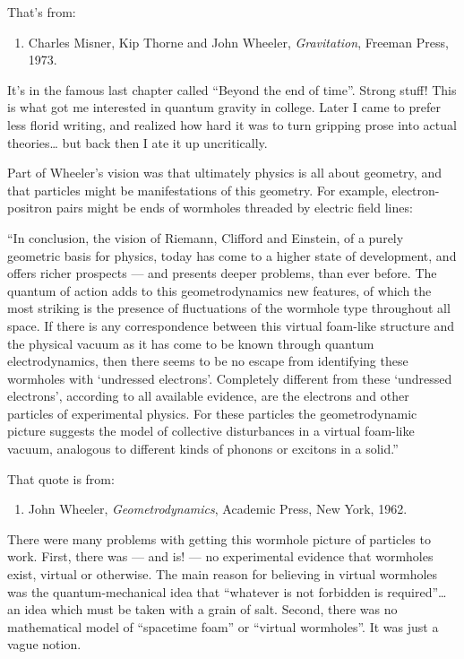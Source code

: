 \documentclass{article}
\def\tightlist{}
\begin{document}
That's from:

\begin{enumerate}
\def\labelenumi{\arabic{enumi})}
\tightlist
\item
  Charles Misner, Kip Thorne and John Wheeler, \emph{Gravitation},
  Freeman Press, 1973.
\end{enumerate}

It's in the famous last chapter called ``Beyond the end of time''.
Strong stuff! This is what got me interested in quantum gravity in
college. Later I came to prefer less florid writing, and realized how
hard it was to turn gripping prose into actual theories\ldots{} but back
then I ate it up uncritically.

Part of Wheeler's vision was that ultimately physics is all about
geometry, and that particles might be manifestations of this geometry.
For example, electron-positron pairs might be ends of wormholes threaded
by electric field lines:

``In conclusion, the vision of Riemann, Clifford and Einstein, of a
purely geometric basis for physics, today has come to a higher state of
development, and offers richer prospects --- and presents deeper
problems, than ever before. The quantum of action adds to this
geometrodynamics new features, of which the most striking is the
presence of fluctuations of the wormhole type throughout all space. If
there is any correspondence between this virtual foam-like structure and
the physical vacuum as it has come to be known through quantum
electrodynamics, then there seems to be no escape from identifying these
wormholes with `undressed electrons'. Completely different from these
`undressed electrons', according to all available evidence, are the
electrons and other particles of experimental physics. For these
particles the geometrodynamic picture suggests the model of collective
disturbances in a virtual foam-like vacuum, analogous to different kinds
of phonons or excitons in a solid.''

That quote is from:

\begin{enumerate}
\def\labelenumi{\arabic{enumi})}
\setcounter{enumi}{1}
\tightlist
\item
  John Wheeler, \emph{Geometrodynamics}, Academic Press, New York, 1962.
\end{enumerate}

There were many problems with getting this wormhole picture of particles
to work. First, there was --- and is! --- no experimental evidence that
wormholes exist, virtual or otherwise. The main reason for believing in
virtual wormholes was the quantum-mechanical idea that ``whatever is not
forbidden is required''\ldots{} an idea which must be taken with a grain
of salt. Second, there was no mathematical model of ``spacetime foam''
or ``virtual wormholes''. It was just a vague notion.
\end{document}
